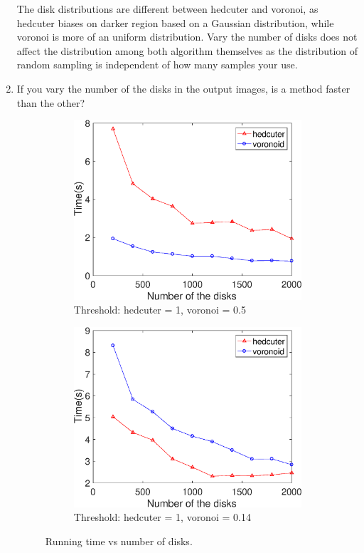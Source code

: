 \documentclass[11pt]{article}
\begin{document}
\begin{enumerate}
The disk distributions are different between hedcuter and voronoi, as  hedcuter biases on darker region based on a Gaussian distribution, while voronoi is more of an uniform distribution. Vary the number of disks does not affect the distribution among both algorithm themselves as the distribution of random sampling is independent of how many samples your use.

\item If you vary the number of the disks in the output images, is a method faster than the other?

\begin{figure}[H]
    \centering
        \begin{subfigure}{0.45\textwidth}
        \centering
        \includegraphics[width=\textwidth]{figs/time2.eps}
    \caption{Threshold: hedcuter = 1, voronoi = 0.5}
    \end{subfigure}
    \begin{subfigure}{0.45\textwidth}
        \centering
        \includegraphics[width=\textwidth]{figs/time.eps}
         \caption{Threshold: hedcuter = 1, voronoi  = 0.14 }
    \end{subfigure}
    \label{fig:2}
      \caption{Running time vs number of disks.}
\end{figure}


\end{enumerate}
\end{document}
